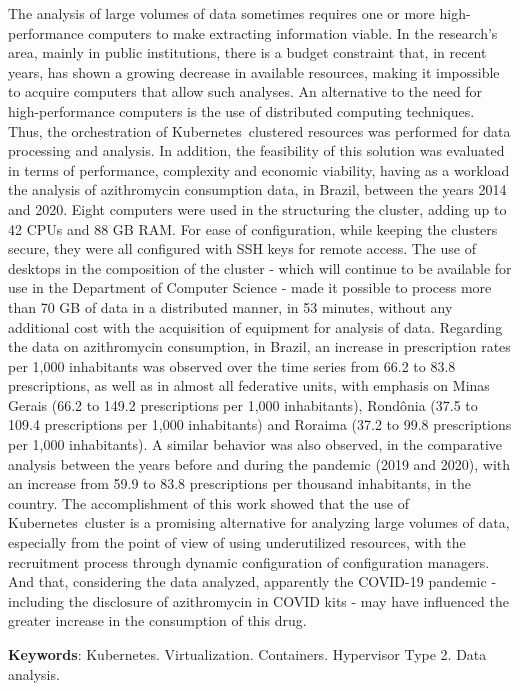
\begin{resumo}[Abstract]
    The analysis of large volumes of data sometimes requires one or more high-performance computers to make extracting information viable. In the research's area, mainly in public institutions, there is a budget constraint that, in recent years, has shown a growing decrease in available resources, making it impossible to acquire computers that allow such analyses. An alternative to the need for high-performance computers is the use of distributed computing techniques. Thus, the orchestration of Kubernetes\textregistered\ clustered resources was performed for data processing and analysis. In addition, the feasibility of this solution was evaluated in terms of performance, complexity and economic viability, having as a workload the analysis of azithromycin consumption data, in Brazil, between the years 2014 and 2020. Eight computers were used in the structuring the cluster, adding up to 42 CPUs and 88 GB RAM. For ease of configuration, while keeping the clusters secure, they were all configured with SSH keys for remote access. The use of desktops in the composition of the cluster - which will continue to be available for use in the Department of Computer Science - made it possible to process more than 70 GB of data in a distributed manner, in 53 minutes, without any additional cost with the acquisition of equipment for analysis of data. Regarding the data on azithromycin consumption, in Brazil, an increase in prescription rates per 1,000 inhabitants was observed over the time series from 66.2 to 83.8 prescriptions, as well as in almost all federative units, with emphasis on Minas Gerais (66.2 to 149.2 prescriptions per 1,000 inhabitants), Rondônia (37.5 to 109.4 prescriptions per 1,000 inhabitants) and Roraima (37.2 to 99.8 prescriptions per 1,000 inhabitants). A similar behavior was also observed, in the comparative analysis between the years before and during the pandemic (2019 and 2020), with an increase from 59.9 to 83.8 prescriptions per thousand inhabitants, in the country. The accomplishment of this work showed that the use of Kubernetes\textregistered\ cluster is a promising alternative for analyzing large volumes of data, especially from the point of view of using underutilized resources, with the recruitment process through dynamic configuration of configuration managers. And that, considering the data analyzed, apparently the COVID-19 pandemic - including the disclosure of azithromycin in COVID kits - may have influenced the greater increase in the consumption of this drug.


    \textbf{Keywords}: Kubernetes. Virtualization. Containers. Hypervisor Type 2. Data analysis.
\end{resumo}

